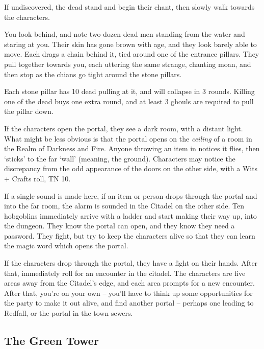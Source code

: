 \begin{multicols}{2}
If undiscovered, the dead stand and begin their chant, then slowly walk towards the characters.

\begin{boxtext}
	You look behind, and note two-dozen dead men standing from the water and staring at you.  Their skin has gone brown with age, and they look barely able to move.  Each drags a chain behind it, tied around one of the entrance pillars.  They pull together towards you, each uttering the same strange, chanting moan, and then stop as the chians go tight around the stone pillars.
\end{boxtext}

Each stone pillar has 10 dead pulling at it, and will collapse in 3 rounds.  Killing one of the dead buys one extra round, and at least 3 ghouls are required to pull the pillar down.

If the characters open the portal, they see a dark room, with a distant light.  What might be less obvious is that the portal opens on the \emph{ceiling} of a room in the Realm of Darkness and Fire.  Anyone throwing an item in notices it flies, then `sticks' to the far `wall' (meaning, the ground).  Characters may notice the discrepancy from the odd appearance of the doors on the other side, with a Wits + Crafts roll, TN 10.

If a single sound is made here, if an item or person drops through the portal and into the far room, the alarm is sounded in the Citadel on the other side.  Ten hobgoblins immediately arrive with a ladder and start making their way up, into the dungeon.  They know the portal can open, and they know they need a password.  They fight, but try to keep the characters alive so that they can learn the magic word which opens the portal.

If the characters drop through the portal, they have a fight on their hands.  After that, immediately roll for an encounter in the citadel.  The characters are five areas away from the Citadel's edge, and each area prompts for a new encounter.  After that, you're on your own -- you'll have to think up some opportunities for the party to make it out alive, and find another portal -- perhaps one leading to Redfall, or the portal in the town sewers.

\end{multicols}

\subsection{The Green Tower}\label{green_tower}\setcounter{list}{0}

